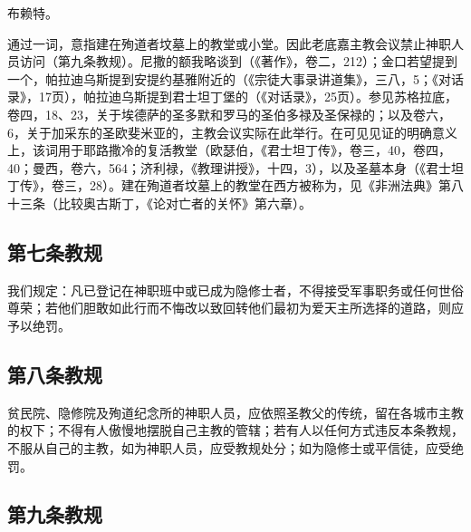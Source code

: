 布赖特。\par

通过一词，意指建在殉道者坟墓上的教堂或小堂。因此老底嘉主教会议禁止神职人员访问（第九条教规）。尼撒的额我略谈到（《著作》，卷二，212）；金口若望提到一个，帕拉迪乌斯提到安提约基雅附近的（《宗徒大事录讲道集》，三八，5；《对话录》，17页），帕拉迪乌斯提到君士坦丁堡的（《对话录》，25页）。参见苏格拉底，卷四，18、23，关于埃德萨的圣多默和罗马的圣伯多禄及圣保禄的；以及卷六，6，关于加采东的圣欧斐米亚的，主教会议实际在此举行。在可见见证的明确意义上，该词用于耶路撒冷的复活教堂（欧瑟伯，《君士坦丁传》，卷三，40，卷四，40；曼西，卷六，564；济利禄，《教理讲授》，十四，3），以及圣墓本身（《君士坦丁传》，卷三，28）。建在殉道者坟墓上的教堂在西方被称为，见《非洲法典》第八十三条（比较奥古斯丁，《论对亡者的关怀》第六章）。\par


\subsection{第七条教规}

我们规定：凡已登记在神职班中或已成为隐修士者，不得接受军事职务或任何世俗尊荣；若他们胆敢如此行而不悔改以致回转他们最初为爱天主所选择的道路，则应予以绝罚。\par


\subsection{第八条教规}

贫民院、隐修院及殉道纪念所的神职人员，应依照圣教父的传统，留在各城市主教的权下；不得有人傲慢地摆脱自己主教的管辖；若有人以任何方式违反本条教规，不服从自己的主教，如为神职人员，应受教规处分；如为隐修士或平信徒，应受绝罚。\par


\subsection{第九条教规}

